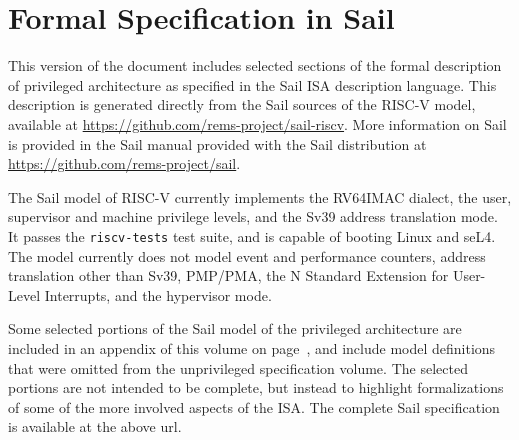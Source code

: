\section{Formal Specification in Sail}
\label{sect:priv-sail-model}

This version of the document includes selected sections of the formal
description of privileged architecture as specified in the Sail ISA
description language\cite{sail-site}.  This description is generated
directly from the Sail sources of the RISC-V model, available at
\url{https://github.com/rems-project/sail-riscv}.  More information on
Sail is provided in the Sail manual provided with the Sail
distribution at \url{https://github.com/rems-project/sail}.

The Sail model of RISC-V currently implements the RV64IMAC dialect,
the user, supervisor and machine privilege levels, and the Sv39
address translation mode.  It passes the \texttt{riscv-tests} test
suite, and is capable of booting Linux and seL4.  The model currently
does not model event and performance counters, address translation
other than Sv39, PMP/PMA, the N Standard Extension for User-Level
Interrupts, and the hypervisor mode.

Some selected portions of the Sail model of the privileged
architecture are included in an appendix of this volume on
page~\pageref{chap:priv-sail-model}, and include model definitions
that were omitted from the unprivileged specification volume.  The
selected portions are not intended to be complete, but instead to
highlight formalizations of some of the more involved aspects of the
ISA.  The complete Sail specification is available at the above url.
